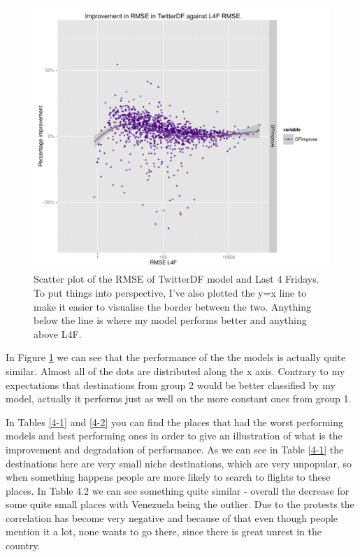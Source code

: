 \documentclass[minf,twoside,singlespacing,parskip,frontabs]{infthesis}
\begin{document}
\begin{figure}[]
\begin{center}
\includegraphics[scale=0.7]{RMSE}
\end{center}
\caption{Scatter plot of the RMSE of TwitterDF model and Last 4 Fridays. To put things into perspective, I've also plotted the y=x line to make it easier to visualise the border between the two. Anything below the line is where my model performs better and anything above L4F.  }
\label{rmse-scatter}
\end{figure}


In Figure \ref{rmse-scatter} we can see that the performance of the the models is actually quite similar. Almost all of the dots are distributed along the x axis. Contrary to my expectations that destinations from group 2 would be better classified by my model, actually it performs just as well on the more constant ones from group 1. 

In Tables \ref{4-1} and \ref{4-2} you can find the places that had the worst performing models and best performing ones in order to give an illustration of what is the improvement and degradation of performance. As we can see in Table \ref{4-1} the destinations here are very small niche destinations, which are very unpopular, so when something happens people are more likely to search to flights to these places. In Table 4.2 we can see something quite similar - overall the decrease for some quite small places with Venezuela being the outlier. Due to the protests the correlation has become very negative and because of that even though people mention it a lot, none wants to go there, since there is great unrest in the country. 
\end{document}
